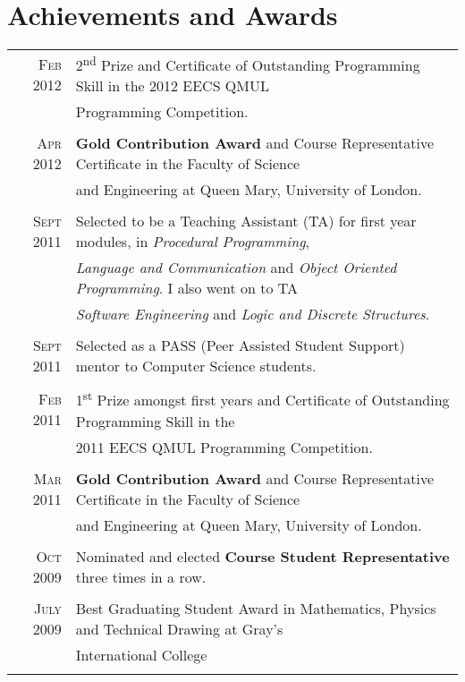 \documentclass[a4paper,10pt]{article}
\begin{document}
\section{Achievements and Awards}
\begin{tabular}{rl}
  \textsc{Feb} 2012 & 2\textsuperscript{nd}  Prize and Certificate of Outstanding Programming Skill
  in the 2012 EECS QMUL\\& Programming Competition.\\\\

  \textsc{Apr} 2012 & \textbf{Gold Contribution Award} and Course Representative Certificate in the
  Faculty of Science\\& and Engineering at Queen Mary, University of London.\\\\

  \textsc{Sept} 2011 & Selected to be a Teaching Assistant (TA) for first year modules, in
  \textit{Procedural Programming},\\& \textit{Language and  Communication} and \textit{Object
  Oriented Programming}. I also went on to TA\\& \textit{Software Engineering} and \textit{Logic
  and Discrete Structures}.\\\\

  \textsc{Sept} 2011 & Selected as a PASS (Peer Assisted Student Support) mentor to Computer Science
  students.\\\\

  \textsc{Feb} 2011 & 1\textsuperscript{st} Prize amongst first years and Certificate of Outstanding Programming
  Skill in the\\& 2011 EECS QMUL Programming Competition.\\\\

  \textsc{Mar} 2011 & \textbf{Gold Contribution Award} and Course Representative Certificate in the
  Faculty of Science\\& and Engineering at Queen Mary, University of London.\\\\

  \textsc{Oct} 2009 & Nominated and elected \textbf{Course Student Representative} three times in a
  row.\\\\

  \textsc{July} 2009 & Best Graduating Student Award in Mathematics, Physics and Technical Drawing
  at Gray’s\\& International College\\\\


\end{tabular}
\end{document}
